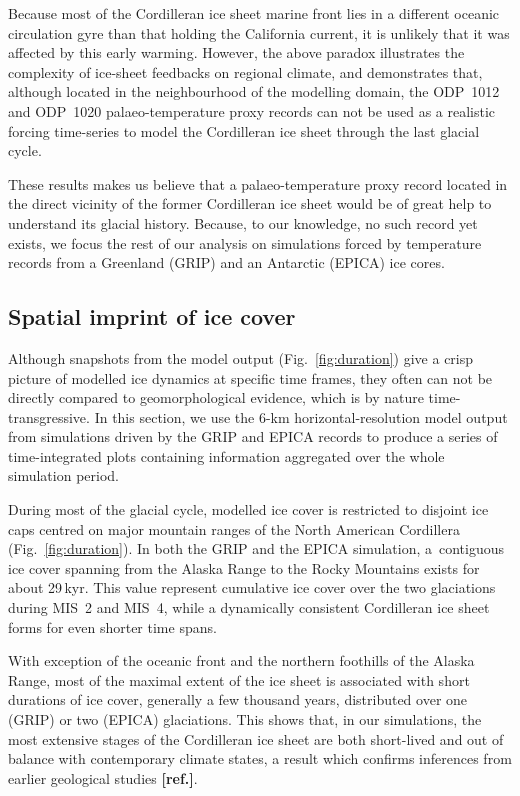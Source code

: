 \documentclass[tc, ms]{copernicus}
\newcommand{\aref}[0]{\textbf{[ref.]}}
\begin{document}
Because most of the Cordilleran ice sheet marine front lies in a different
oceanic circulation gyre than that holding the California current, it is
unlikely that it was affected by this early warming. However, the above paradox
illustrates the complexity of ice-sheet feedbacks on regional climate, and
demonstrates that, although located in the neighbourhood of the modelling
domain, the ODP~1012 and ODP~1020 palaeo-temperature proxy records can not be
used as a realistic forcing time-series to model the Cordilleran ice sheet
through the last glacial cycle.

These results makes us believe that a palaeo-temperature proxy record located
in the direct vicinity of the former Cordilleran ice sheet would be of great
help to understand its glacial history. Because, to our knowledge, no such
record yet exists, we focus the rest of our analysis on simulations forced by
temperature records from a Greenland (GRIP) and an Antarctic (EPICA) ice cores.

\subsection{Spatial imprint of ice cover}

Although snapshots from the model output (Fig.~\ref{fig:duration}) give a
crisp picture of modelled ice dynamics at specific time frames, they often
can not be directly compared to geomorphological evidence, which is by nature
time-transgressive. In this section, we use the 6-km horizontal-resolution
model output from simulations driven by the GRIP and EPICA records to produce
a series of time-integrated plots containing information aggregated over the
whole simulation period.

During most of the glacial cycle, modelled ice cover is restricted to disjoint
ice caps centred on major mountain ranges of the North American Cordillera
(Fig.~\ref{fig:duration}). In both the GRIP and the EPICA simulation,
a~contiguous ice cover spanning from the Alaska Range to the Rocky Mountains
exists for about 29\,\unit{kyr}. This value represent cumulative ice cover over
the two glaciations during MIS~2 and MIS~4, while a dynamically consistent
Cordilleran ice sheet forms for even shorter time spans.

With exception of the oceanic front and the northern foothills of the Alaska
Range, most of the maximal extent of the ice sheet is associated with short
durations of ice cover, generally a few thousand years, distributed over one
(GRIP) or two (EPICA) glaciations. This shows that, in our simulations, the
most extensive stages of the Cordilleran ice sheet are both short-lived and
out of balance with contemporary climate states, a result which confirms
inferences from earlier geological studies \aref.
\end{document}
